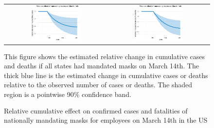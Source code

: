 \documentclass[11pt,reqno,letter]{amsart}
\theoremstyle{definition}
\begin{document}
\begin{figure}[ht]
  \caption{Relative cumulative effect  on confirmed cases and fatalities 
  of nationally mandating masks for employees on March
    14th in the US \label{fig:US-mask-dgrowth}}
  \begin{minipage}{\linewidth}
    \centering
    \medskip
    \begin{tabular}{cc}
      \includegraphics[width=0.49\textwidth]{tables_and_figures/us-mask-rcumu_idx}
      & \includegraphics[width=0.49\textwidth]{tables_and_figures/us-mask-rcumu_deaths_idx}
    \end{tabular}
    \begin{flushleft}
      \footnotesize This figure shows the estimated relative change in
      cumulative cases and deaths if all states had mandated masks on
      March 14th. The thick blue line is the estimated change in
      cumulative cases or deaths relative to the observed number of
      cases or deaths. The shaded region is a pointwise 90\%
      confidence band.
    \end{flushleft}
  \end{minipage}
\end{figure}
\end{document}
